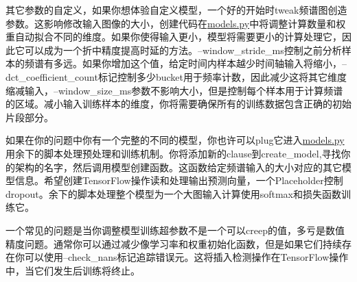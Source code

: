 其它参数的自定义，如果你想体验自定义模型，一个好的开始时tweak频谱图创造参数。这影响修改输入图像的大小，创建代码在\href{https://github.com/tensorflow/tensorflow/tree/master/tensorflow/examples/speech_commands/models.py}{models.py}中将调整计算数量和权重自动拟合不同的维度。如果你使得输入更小，模型将需要更小的计算处理它，因此它可以成为一个折中精度提高时延的方法。--window\_stride\_ms控制之前分析样本的频谱有多远。如果你增加这个值，给定时间内样本越少时间轴输入将缩小，--dct\_coefficient\_count标记控制多少bucket用于频率计数，因此减少这将其它维度缩减输入，--window\_size\_ms参数不影响大小，但是控制每个样本用于计算频谱的区域。减小输入训练样本的维度，你将需要确保所有的训练数据包含正确的初始片段部分。

如果在你的问题中你有一个完整的不同的模型，你也许可以plug它进入\href{https://github.com/tensorflow/tensorflow/tree/master/tensorflow/examples/speech_commands/models.py}{models.py}用余下的脚本处理预处理和训练机制。你将添加新的clause到create\_model,寻找你的架构的名字，然后调用模型创建函数。这函数给定频谱输入的大小对应的其它模型信息。希望创建TensorFlow操作读和处理输出预测向量，一个Placeholder控制dropout。余下的脚本处理整个模型为一个大图输入计算使用softmax和损失函数训练它。

一个常见的问题是当你调整模型训练超参数不是一个可以creep的值，多亏是数值精度问题。通常你可以通过减少像学习率和权重初始化函数，但是如果它们持续存在你可以使用--check\_nans标记追踪错误元。这将插入检测操作在TensorFlow操作中，当它们发生后训练将终止。

